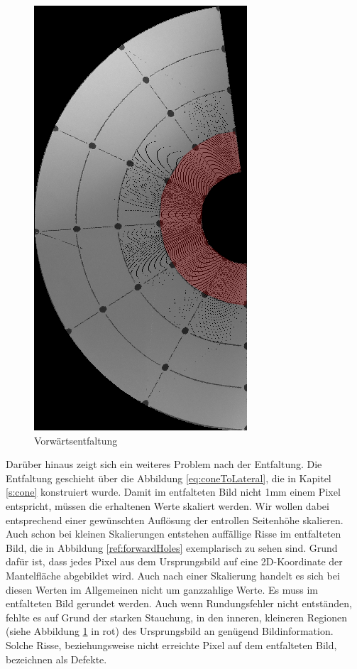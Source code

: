 \begin{figure}[!htb]
	\centering
	\includegraphics[angle=-90, width=.7\textwidth]{images/coneRaspUnWarpForwardHigh.png}
	\caption{Vorwärtsentfaltung}
	\label{fig:forwardHoles}
\end{figure}

Darüber hinaus zeigt sich ein weiteres Problem nach der Entfaltung. Die Entfaltung geschieht über die Abbildung \ref{eq:coneToLateral}, die in Kapitel \ref{s:cone} konstruiert wurde. 
Damit im entfalteten Bild nicht 1mm einem Pixel entspricht, müssen die erhaltenen Werte skaliert werden. Wir wollen dabei entsprechend einer gewünschten Auflösung der entrollen Seitenhöhe skalieren. 
Auch schon bei kleinen Skalierungen entstehen auffällige Risse im entfalteten Bild, die in Abbildung \ref{ref:forwardHoles} exemplarisch zu sehen sind. Grund dafür ist, dass jedes Pixel aus dem Ursprungsbild auf eine 2D-Koordinate der Mantelfläche abgebildet wird. Auch nach einer Skalierung handelt es sich bei diesen Werten im Allgemeinen nicht um ganzzahlige Werte. Es muss im entfalteten Bild gerundet werden. Auch wenn Rundungsfehler nicht entständen, fehlte es auf Grund der starken Stauchung, in den inneren, kleineren Regionen (siehe Abbildung \ref{fig:forwardHoles} in rot) des Ursprungsbild an genügend Bildinformation. Solche Risse, beziehungsweise nicht erreichte Pixel auf dem entfalteten Bild, bezeichnen als Defekte. 

